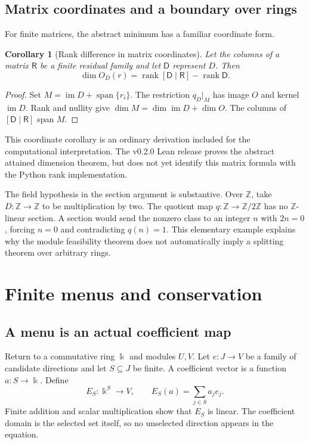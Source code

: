 \documentclass[11pt,letterpaper,oneside,openany]{book}
\theoremstyle{quiet}
\newtheorem{corollary}[theorem]{Corollary}
\newcommand{\kk}{\Bbbk}
\newcommand{\Z}{\mathbb{Z}}
\DeclareMathOperator{\im}{im}
\DeclareMathOperator{\Span}{span}
\DeclareMathOperator{\rank}{rank}
\newcommand{\sourcescope}[1]{\par\begingroup\small\color{Slate}#1\par\endgroup}
\begin{document}
\section{Matrix coordinates and a boundary over rings}
For finite matrices, the abstract minimum has a familiar coordinate form.

\begin{corollary}[Rank difference in matrix coordinates]\label{cor:rank-difference}
Let the columns of a matrix $\mathsf R$ be a finite residual family and let $\mathsf D$ represent $D$. Then
\[
\dim O_D(r)=\rank[\mathsf D\mid\mathsf R]-\rank\mathsf D.
\]
\end{corollary}
\begin{proof}
Set $M=\im D+\Span\{r_i\}$. The restriction $q_D\vert_M$ has image $O$ and kernel $\im D$. Rank and nullity give $\dim M=\dim\im D+\dim O$. The columns of $[\mathsf D\mid\mathsf R]$ span $M$.
\end{proof}
\sourcescope{This coordinate corollary is an ordinary derivation included for the computational interpretation. The v0.2.0 Lean release proves the abstract attained dimension theorem, but does not yet identify this matrix formula with the Python rank implementation.}

The field hypothesis in the section argument is substantive. Over $\Z$, take $D:\Z\to\Z$ to be multiplication by two. The quotient map $q:\Z\to\Z/2\Z$ has no $\Z$-linear section. A section would send the nonzero class to an integer $n$ with $2n=0$, forcing $n=0$ and contradicting $q(n)=1$. This elementary example explains why the module feasibility theorem does not automatically imply a splitting theorem over arbitrary rings.



\chapter{Finite menus and conservation}\label{ch:menu}
\section{A menu is an actual coefficient map}
Return to a commutative ring $\kk$ and modules $U,V$. Let $e:J\to V$ be a family of candidate directions and let $S\subseteq J$ be finite. A coefficient vector is a function $a:S\to\kk$. Define
\begin{equation}\label{eq:menu}
E_S:\kk^S\longrightarrow V,\qquad E_S(a)=\sum_{j\in S}a_je_j.
\end{equation}
Finite addition and scalar multiplication show that $E_S$ is linear. The coefficient domain is the selected set itself, so no unselected direction appears in the equation.
\end{document}
